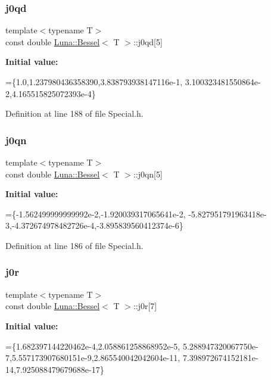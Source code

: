 \subsubsection{\texorpdfstring{j0qd}{j0qd}}
{\footnotesize\ttfamily template$<$typename T$>$ \\
const double \hyperlink{structLuna_1_1Bessel}{Luna\+::\+Bessel}$<$ T $>$\+::j0qd\mbox{[}5\mbox{]}}

{\bfseries Initial value\+:}
\begin{DoxyCode}
=\{1.0,1.237980436358390,3.838793938147116e-1,
        3.100323481550864e-2,4.165515825072393e-4\}
\end{DoxyCode}


Definition at line 188 of file Special.\+h.

\mbox{\label{structLuna_1_1Bessel_a5d64c71be5d9ec982587b391a3e2373f}} 
\subsubsection{\texorpdfstring{j0qn}{j0qn}}
{\footnotesize\ttfamily template$<$typename T$>$ \\
const double \hyperlink{structLuna_1_1Bessel}{Luna\+::\+Bessel}$<$ T $>$\+::j0qn\mbox{[}5\mbox{]}}

{\bfseries Initial value\+:}
\begin{DoxyCode}
=\{-1.562499999999992e-2,-1.920039317065641e-2,
        -5.827951791963418e-3,-4.372674978482726e-4,-3.895839560412374e-6\}
\end{DoxyCode}


Definition at line 186 of file Special.\+h.

\mbox{\label{structLuna_1_1Bessel_a37ddc99f8caaca6814791a3f425370c5}} 
\subsubsection{\texorpdfstring{j0r}{j0r}}
{\footnotesize\ttfamily template$<$typename T$>$ \\
const double \hyperlink{structLuna_1_1Bessel}{Luna\+::\+Bessel}$<$ T $>$\+::j0r\mbox{[}7\mbox{]}}

{\bfseries Initial value\+:}
\begin{DoxyCode}
=\{1.682397144220462e-4,2.058861258868952e-5,
        5.288947320067750e-7,5.557173907680151e-9,2.865540042042604e-11,
        7.398972674152181e-14,7.925088479679688e-17\}
\end{DoxyCode}


